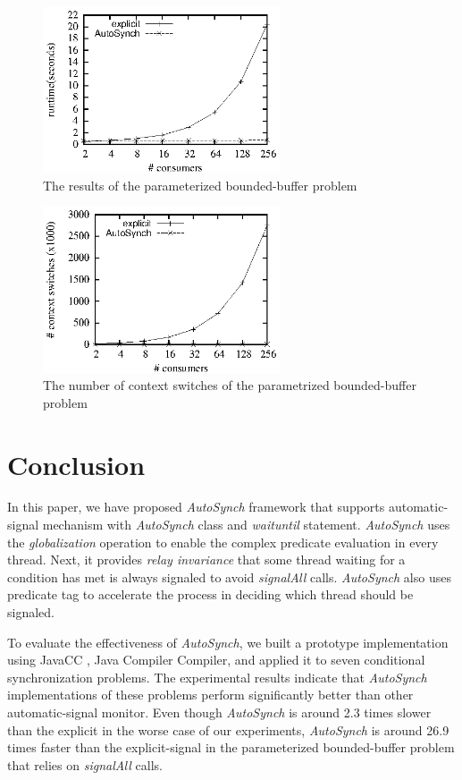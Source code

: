 \documentclass[preprint]{sigplanconf}
\begin{document}
\begin{figure}[ht!]
  \centering
  \includegraphics[width=70mm]{fig/rpc.eps}
  \caption{The results of the parameterized bounded-buffer problem}
  \label{fig:rpc_eval}
\end{figure}

\begin{figure}[ht!]
  \centering
  \includegraphics[width=70mm]{fig/csrpc.eps}
  \caption{The number of context switches of the parametrized bounded-buffer 
  problem}
\label{fig:csrpc_eval}
\end{figure}



\section{Conclusion} \label{sec:conclu}
In this paper, we have proposed {\em AutoSynch} framework that supports 
automatic-signal mechanism with {\em AutoSynch} class and {\em waituntil} statement.
{\em AutoSynch} uses the {\em globalization} operation to enable the complex predicate 
evaluation in every thread. Next, it provides {\em relay invariance} that some
thread waiting for a condition has met is always signaled to avoid {\em signalAll}
calls. {\em AutoSynch} also uses predicate tag to accelerate the process in deciding
which thread should be signaled. 

To evaluate the effectiveness of {\em AutoSynch}, we built a prototype implementation
using JavaCC \cite{kod04}, Java Compiler Compiler,  and applied it to seven 
conditional synchronization problems. The experimental results indicate that 
{\em AutoSynch} implementations of these problems perform significantly better than
other automatic-signal monitor. Even though {\em AutoSynch} is around 2.3 times 
slower than the explicit in the worse case of our experiments, {\em AutoSynch} is
around 26.9 times faster than the explicit-signal in the parameterized 
bounded-buffer problem that relies on {\em signalAll} calls. 
\end{document}
